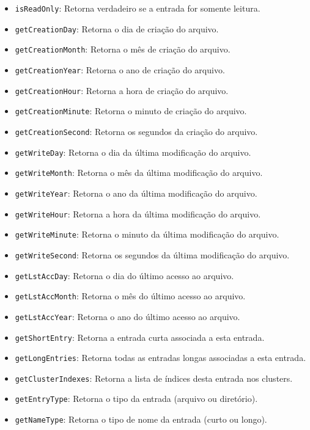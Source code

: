 \documentclass[
    12pt,				%
    oneside,   	        %
    a4paper,			%
    english,			%
    french,				%
    spanish,			%
    brazil,				%
    ]{pacotes/abntex2}
\begin{document}
\begin{itemize}
\begin{itemize}
            \item \texttt{isReadOnly}: Retorna verdadeiro se a entrada for somente leitura.
            \item \texttt{getCreationDay}: Retorna o dia de criação do arquivo.
            \item \texttt{getCreationMonth}: Retorna o mês de criação do arquivo.
            \item \texttt{getCreationYear}: Retorna o ano de criação do arquivo.
            \item \texttt{getCreationHour}: Retorna a hora de criação do arquivo.
            \item \texttt{getCreationMinute}: Retorna o minuto de criação do arquivo.
            \item \texttt{getCreationSecond}: Retorna os segundos da criação do arquivo.
            \item \texttt{getWriteDay}: Retorna o dia da última modificação do arquivo.
            \item \texttt{getWriteMonth}: Retorna o mês da última modificação do arquivo.
            \item \texttt{getWriteYear}: Retorna o ano da última modificação do arquivo.
            \item \texttt{getWriteHour}: Retorna a hora da última modificação do arquivo.
            \item \texttt{getWriteMinute}: Retorna o minuto da última modificação do arquivo.
            \item \texttt{getWriteSecond}: Retorna os segundos da última modificação do arquivo.
            \item \texttt{getLstAccDay}: Retorna o dia do último acesso ao arquivo.
            \item \texttt{getLstAccMonth}: Retorna o mês do último acesso ao arquivo.
            \item \texttt{getLstAccYear}: Retorna o ano do último acesso ao arquivo.
            \item \texttt{getShortEntry}: Retorna a entrada curta associada a esta entrada.
            \item \texttt{getLongEntries}: Retorna todas as entradas longas associadas a esta entrada.
            \item \texttt{getClusterIndexes}: Retorna a lista de índices desta entrada nos clusters.
            \item \texttt{getEntryType}: Retorna o tipo da entrada (arquivo ou diretório).
            \item \texttt{getNameType}: Retorna o tipo de nome da entrada (curto ou longo).
        \end{itemize}
\end{itemize}
\end{document}
